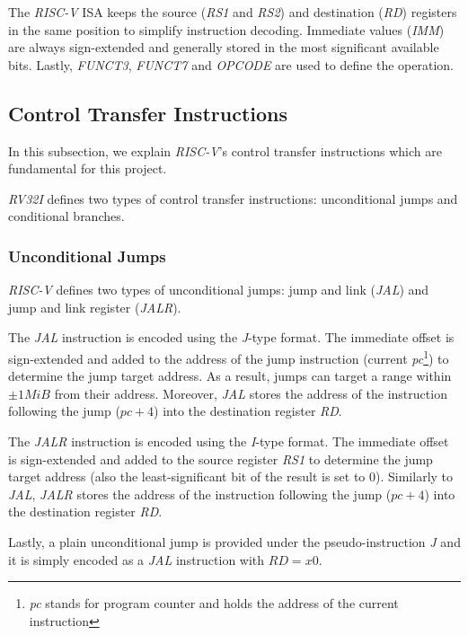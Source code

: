 The \textit{RISC-V} ISA keeps the source (\textit{RS1} and \textit{RS2}) and
destination (\textit{RD}) registers in the same position to simplify instruction
decoding. Immediate values (\textit{IMM}) are always sign-extended and generally
stored in the most significant available bits. Lastly, \textit{FUNCT3}, \textit{FUNCT7}
and \textit{OPCODE} are used to define the operation.

\subsection{Control Transfer Instructions}
\label{subsec:riscv_controltransfer}

In this subsection, we explain \textit{RISC-V}'s control transfer instructions
which are fundamental for this project.

\textit{RV32I} defines two types of control transfer instructions: unconditional
jumps and conditional branches.

\subsubsection{Unconditional Jumps}
\label{subsubsec:riscv_unconditionalj}

\textit{RISC-V} defines two types of unconditional jumps: jump and link (\textit{JAL})
and jump and link register (\textit{JALR}).

The \textit{JAL} instruction is encoded using the \textit{J}-type format. The
immediate offset is sign-extended and added to the address of the jump
instruction (current \textit{pc}\footnote{\textit{pc} stands for program counter
and holds the address of the current instruction}) to determine the jump target
address. As a result, jumps can target a range within $\pm 1 MiB$ from their
address. Moreover, \textit{JAL} stores the address of the instruction following the
jump ($\textit{pc}+ 4$) into the destination register \textit{RD}.

The \textit{JALR} instruction is encoded using the \textit{I}-type format. The immediate
offset is sign-extended and added to the source register \textit{RS1} to
determine the jump target address (also the least-significant bit of the result is
set to $0$). Similarly to \textit{JAL}, \textit{JALR} stores the address of the
instruction following the jump ($\textit{pc}+ 4$) into the destination register
\textit{RD}.

Lastly, a plain unconditional jump is provided under the pseudo-instruction
\textit{J} and it is simply encoded as a \textit{JAL} instruction with
$\textit{RD}= x0$.

